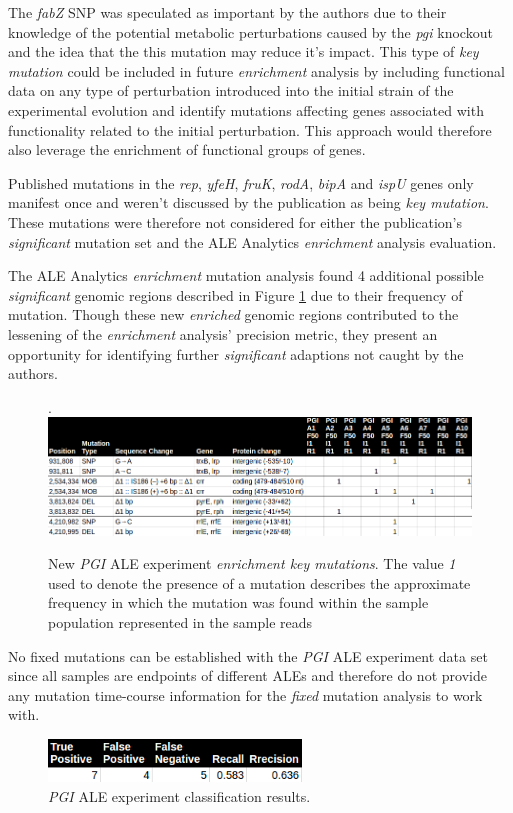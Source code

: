\documentclass[12pt,final,masters,chapterheads]{ucsd}  %
\begin{document}
The \textit{fabZ} SNP was speculated as important by the authors due to their knowledge of the potential metabolic perturbations caused by the \textit{pgi} knockout and the idea that the this mutation may reduce it's impact. This type of \textit{key mutation} could be included in future \textit{enrichment} analysis by including functional data on any type of perturbation introduced into the initial strain of the experimental evolution and identify mutations affecting genes associated with functionality related to the initial perturbation. This approach would therefore also leverage the enrichment of functional groups of genes.

Published mutations in the \textit{rep}, \textit{yfeH}, \textit{fruK}, \textit{rodA}, \textit{bipA} and \textit{ispU} genes only manifest once and weren't discussed by the publication as being \textit{key mutation}. These mutations were therefore not considered for either the publication's \textit{significant} mutation set and the ALE Analytics \textit{enrichment} analysis evaluation.

The ALE Analytics \textit{enrichment} mutation analysis found 4 additional possible \textit{significant} genomic regions described in Figure \ref{fig:pgi_new_enrichment_muts} due to their frequency of mutation. Though these new \textit{enriched} genomic regions contributed to the lessening of the \textit{enrichment} analysis' precision metric, they present an opportunity for identifying further \textit{significant} adaptions not caught by the authors.
\begin{figure}[H]
  \caption{New \textit{PGI} ALE experiment \textit{enrichment key mutations}. The value \textit{1} used to denote the presence of a mutation describes the approximate frequency in which the mutation was found within the sample population represented in the sample reads \cite{breseq_paper}}.
  \centering
  \includegraphics[width=\textwidth]{pgi_new_enrichment_muts.png}
  \label{fig:pgi_new_enrichment_muts}
\end{figure}
No fixed mutations can be established with the \textit{PGI} ALE experiment data set since all samples are endpoints of different ALEs and therefore do not provide any mutation time-course information for the \textit{fixed} mutation analysis to work with.
\begin{figure}[H]
  \centering
  \caption{\textit{PGI} ALE experiment classification results.}
  \includegraphics[width=0.6\textwidth]{pgi_precision_recall.png}
\end{figure}
\end{document}
